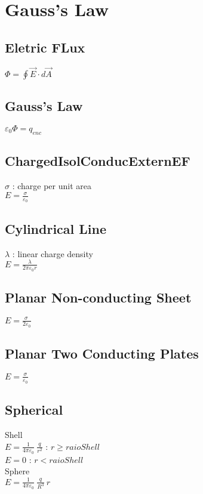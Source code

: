 \section{Gauss's Law}
\subsection{Eletric FLux}
$\Phi =\oint \vec{E}\cdot d\vec{A}$\\
\subsection{Gauss's Law}
$\varepsilon _0\Phi =q_{enc}$\\
\subsection{ChargedIsolConducExternEF}
$\sigma$ : charge per unit area\\
$E=\frac{\sigma }{\varepsilon _0}$\\
\subsection{Cylindrical Line}
$\lambda$ : linear charge density\\
$E=\frac{\lambda }{2\pi \varepsilon _0r}$\\
\subsection{Planar Non-conducting Sheet}
$E=\frac{\sigma \:}{2\varepsilon _0}$\\
\subsection{Planar Two Conducting Plates}
$E=\frac{\sigma }{\varepsilon _0}$\\
\subsection{Spherical}
Shell\\
$E=\frac{1}{4\pi \varepsilon _0}\:\frac{q}{r^2}$ : $r\ge raioShell$\\
$E=0$ : $r < raioShell$\\
Sphere\\
$E=\frac{1}{4\pi \varepsilon _0}\:\frac{q}{R^3}\:r$\\
